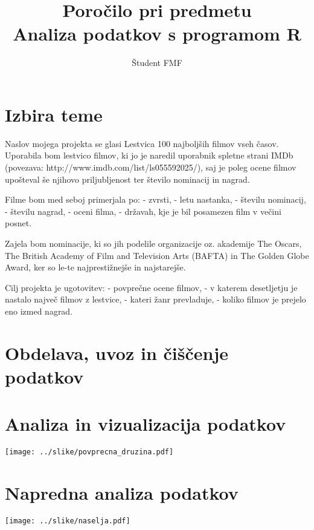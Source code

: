 \documentclass[11pt,a4paper]{article}
\begin{document}
\title{Poročilo pri predmetu \\
Analiza podatkov s programom R}
\author{Študent FMF}
\maketitle

\section{Izbira teme}
Naslov mojega projekta se glasi Lestvica 100 najboljših filmov vseh časov. Uporabila bom lestvico filmov, ki jo je naredil uporabnik spletne strani IMDb (povezava: http://www.imdb.com/list/ls055592025/), saj je poleg ocene filmov upošteval še njihovo priljubljenost ter število nominacij in nagrad.

Filme bom med seboj primerjala po:
- zvrsti,
- letu nastanka,
- številu nominacij,
- številu nagrad,
- oceni filma, 
- državah, kje je bil posamezen film v večini posnet.

Zajela bom nominacije, ki so jih podelile organizacije oz. akademije The Oscars, The British Academy of Film and Television Arts (BAFTA) in The Golden Globe Award, ker so le-te najprestižnejše in najstarejše.  

Cilj projekta je ugotovitev:
- povprečne ocene filmov,
- v katerem desetljetju je nastalo največ filmov z lestvice,
- kateri žanr prevladuje,
- koliko filmov je prejelo eno izmed nagrad. 

\section{Obdelava, uvoz in čiščenje podatkov}

\section{Analiza in vizualizacija podatkov}

\texttt{[image: ../slike/povprecna\_druzina.pdf]}

\section{Napredna analiza podatkov}

\texttt{[image: ../slike/naselja.pdf]}
\end{document}

